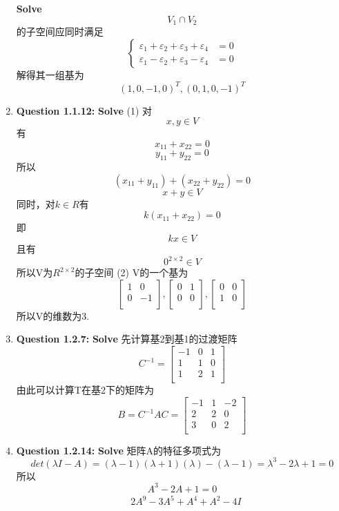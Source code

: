 \documentclass[UTF8]{uofa-eng-assignment}
\begin{document}
\begin{enumerate}
\textbf{Solve}
$$V_1\cap V_2$$的子空间应同时满足
$$
\left\{
\begin{aligned}
\varepsilon_1+\varepsilon_2+\varepsilon_3+\varepsilon_4 &=0\\
\varepsilon_1-\varepsilon_2+\varepsilon_3-\varepsilon_4 &=0
\end{aligned}
\right.
$$
解得其一组基为
$$(1,0,-1,0)^T,(0,1,0,-1)^T$$
\item \textbf{Question 1.1.12:}
\textbf{Solve}
(1)
对$$x,y\in V$$有
$$x_11+x_22=0$$
$$y_11+y_22=0$$
所以
$$(x_11+y_11)+(x_22+y_22)=0$$
$$x+y\in V$$
同时，对$k\in R$有
$$k(x_11+x_22)=0$$
即
$$kx \in V$$
且有$$0^{2\times2}\in V$$
所以V为$R^{2\times 2}$的子空间
(2)
V的一个基为
$$
\left[
\begin{matrix}
    1&0\\
    0&-1\\
\end{matrix}\right],
\left[
\begin{matrix}
    0&1\\
    0&0\\
\end{matrix}\right],
\left[
\begin{matrix}
    0&0\\
    1&0\\
\end{matrix}\right]
$$
所以V的维数为3.
\item \textbf{Question 1.2.7:}
\textbf{Solve}
先计算基2到基1的过渡矩阵
$$C^{-1}=\left[
    \begin{matrix}
        -1&0&1\\
        1&1&0\\
        1&2&1\\
    \end{matrix}\right]
$$
由此可以计算T在基2下的矩阵为
$$
B=C^{-1}AC=\left[
    \begin{matrix}
        -1&1&-2\\
        2&2&0\\
        3&0&2\\
    \end{matrix}\right]
$$
\item \textbf{Question 1.2.14:}
\textbf{Solve}
矩阵A的特征多项式为
$$det(\lambda I-A)=(\lambda-1 )(\lambda+1)(\lambda)-(\lambda-1 )=\lambda^3-2\lambda+1=0
$$
所以
$$A^3-2A+1=0$$
$$
\begin{aligned}
    &2A^9-3A^5+A^4+A^2-4I\\

\end{aligned}$$
\end{enumerate}
\end{document}
